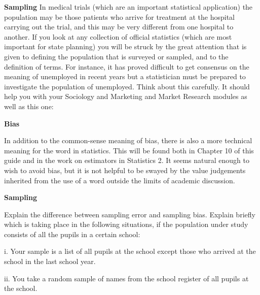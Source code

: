 
\textbf{Sampling}
In medical trials (which are an
important statistical application) the population may be those
patients who arrive for treatment at the hospital carrying out the
trial, and this may be very different from one hospital to
another. If you look at any collection of official statistics
(which are most important for state planning) you will be struck
by the great attention that is given to defining the population
that is surveyed or sampled, and to the definition of terms. For
instance, it has proved difficult to get consensus on the meaning
of unemployed in recent years but a statistician must be
prepared to investigate the population of unemployed. Think about
this carefully. It should help you with your Sociology and
Marketing and Market Research modules as well as this one:


\textbf{Bias}

In addition to the common-sense meaning of bias, there is also a
more technical meaning for the word in statistics. This will be
found both in Chapter 10 of this guide and in the work on
estimators in Statistics 2. It seems natural enough to wish to
avoid bias, but it is not helpful to be swayed by the value
judgements inherited from the use of a word outside the limits of
academic discussion.


\textbf{Sampling}



Explain the difference between sampling error and sampling bias. Explain
briefly which is taking place in the following situations, if the population under study consists of all the pupils in a certain school:

i. Your sample is a list of all pupils at the school except those who arrived
at the school in the last school year.

ii. You take a random sample of names from the school register of all pupils at the school.


